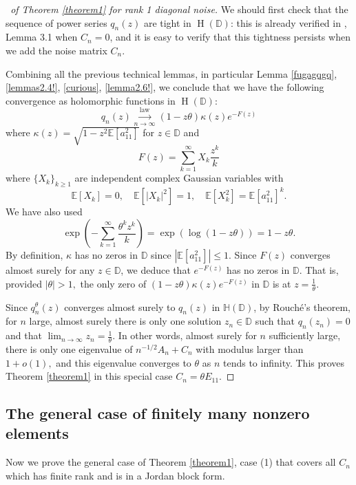 \documentclass[12pt, reqno]{amsart}
\theoremstyle{definition}
\theoremstyle{remark}
\numberwithin{equation}{section}
\begin{document}
\begin{proof}[\proofname\ of Theorem \ref{theorem1} for rank 1 diagonal noise] We should first check that the sequence of power series $q_n(z)$ are tight in $\operatorname{H}(\mathbb{D})$: this is already verified in \cite{bordenave2021convergence}, Lemma 3.1 when $C_n=0$, and it is easy to verify that this tightness persists when we add the noise matrix $C_n$.

Combining all the previous technical lemmas, in particular Lemma \ref{fugagqgq}, \ref{lemmas2.4!}, \ref{curious}, \ref{lemma2.6!}, we conclude that we have the following convergence as holomorphic functions in $\operatorname{H}(\mathbb{D})$:
\begin{equation}
    q_n(z)\overset{\text{law}}{\underset{n\to\infty}\longrightarrow}   (1-z\theta)\kappa(z)e^{-F(z)}
\end{equation}
where $\kappa(z)=\sqrt{1-z^2\mathbb{E}[a_{11}^2]}$ for $z\in\mathbb{D}$ and 
$$F(z)=\sum_{k=1}^\infty X_k\frac{z^k}{k} 
$$ where $\{X_k\}_{k\geq 1}$ are independent complex Gaussian variables with 
$$
\mathbb{E}[X_k]=0,\quad \mathbb{E}[|X_k|^2]=1,\quad \mathbb{E}[X_k^2]=\mathbb{E}[a_{11}^2]^k.
$$
We have also used 
$$
\exp\left(-\sum_{k=1}^\infty\frac{\theta^kz^k}{k}\right)=\exp\left(\log(1-z\theta)\right)=1-z\theta.
$$
By definition, $\kappa$ has no zeros in $\mathbb{D}$ since $|\mathbb{E}[a_{11}^2]|\leq 1.$
Since $F(z)$ converges almost surely for any $z\in\mathbb{D}$, we deduce that $e^{-F(z)}$ has no zeros in $\mathbb{D}$. That is, provided $|\theta|>1,$ the only zero of $(1-z\theta)\kappa(z)e^{-F(z)}$ in $\mathbb{D}$ is at $z=\frac{1}{\theta}$.

Since $q_n^\theta(z)$ converges almost surely to $q_n(z)$ in $\mathbb{H}(\mathbb{D})$, by Rouché's theorem, for $n$ large, almost surely there is only one solution $z_n\in\mathbb{D}$ such that $q_n(z_n)=0$ and that $\lim_{n\to\infty}z_n=\frac{1}{\theta}$. In other words, almost surely for $n$ sufficiently large, there is only one eigenvalue of $n^{-1/2}A_n+C_n$ with modulus larger than $1+o(1),$ and this eigenvalue converges to $\theta$ as $n$ tends to infinity. This proves Theorem \ref{theorem1} in this special case $C_n=\theta E_{11}$.
\end{proof}

\subsection{The general case of finitely many nonzero elements} Now we prove the general case of Theorem \ref{theorem1}, case (1) that covers all $C_n$ which has finite rank and is in a Jordan block form.
\end{document}
